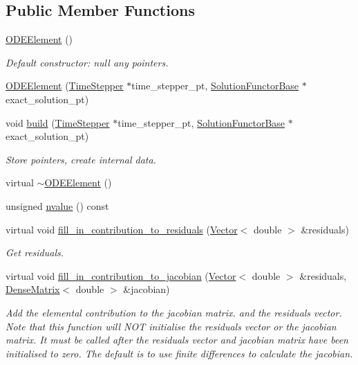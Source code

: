 \subsection*{Public Member Functions}
\begin{DoxyCompactItemize}
\item 
\hyperlink{classoomph_1_1ODEElement_a727627ab2008a2829f73e6e437be04fa}{O\+D\+E\+Element} ()
\begin{DoxyCompactList}\small\item\em Default constructor\+: null any pointers. \end{DoxyCompactList}\item 
\hyperlink{classoomph_1_1ODEElement_a178efce7a692eb0b245e4a64f44b4576}{O\+D\+E\+Element} (\hyperlink{classoomph_1_1TimeStepper}{Time\+Stepper} $\ast$time\+\_\+stepper\+\_\+pt, \hyperlink{classoomph_1_1SolutionFunctorBase}{Solution\+Functor\+Base} $\ast$exact\+\_\+solution\+\_\+pt)
\item 
void \hyperlink{classoomph_1_1ODEElement_ab7885b17adcc0d175a1522197d9d30cf}{build} (\hyperlink{classoomph_1_1TimeStepper}{Time\+Stepper} $\ast$time\+\_\+stepper\+\_\+pt, \hyperlink{classoomph_1_1SolutionFunctorBase}{Solution\+Functor\+Base} $\ast$exact\+\_\+solution\+\_\+pt)
\begin{DoxyCompactList}\small\item\em Store pointers, create internal data. \end{DoxyCompactList}\item 
virtual \hyperlink{classoomph_1_1ODEElement_acc30d7f02f15948f113cc4209ca9ca33}{$\sim$\+O\+D\+E\+Element} ()
\item 
unsigned \hyperlink{classoomph_1_1ODEElement_ad968e4ce7f28115bf97f5854446bb5c4}{nvalue} () const
\item 
virtual void \hyperlink{classoomph_1_1ODEElement_ab13351a18eee7d2ba455312ea755801f}{fill\+\_\+in\+\_\+contribution\+\_\+to\+\_\+residuals} (\hyperlink{classoomph_1_1Vector}{Vector}$<$ double $>$ \&residuals)
\begin{DoxyCompactList}\small\item\em Get residuals. \end{DoxyCompactList}\item 
virtual void \hyperlink{classoomph_1_1ODEElement_a4db1a9984200b201e7aae566afd0cfc6}{fill\+\_\+in\+\_\+contribution\+\_\+to\+\_\+jacobian} (\hyperlink{classoomph_1_1Vector}{Vector}$<$ double $>$ \&residuals, \hyperlink{classoomph_1_1DenseMatrix}{Dense\+Matrix}$<$ double $>$ \&jacobian)
\begin{DoxyCompactList}\small\item\em Add the elemental contribution to the jacobian matrix. and the residuals vector. Note that this function will N\+OT initialise the residuals vector or the jacobian matrix. It must be called after the residuals vector and jacobian matrix have been initialised to zero. The default is to use finite differences to calculate the jacobian. \end{DoxyCompactList}\item 

\end{DoxyCompactItemize}
